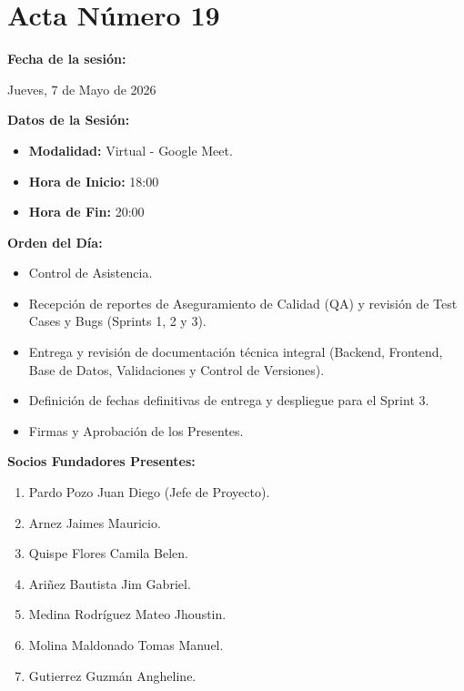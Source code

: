 \newpage
\section{Acta Número 19}
\label{sec:acta19}

\noindent \textbf{Fecha de la sesión:}\par
Jueves, 7 de Mayo de 2026

\vspace*{0.5cm}
\noindent \textbf{Datos de la Sesión:}
\vspace{-0.2cm}
\begin{itemize}[noitemsep]
    \item \textbf{Modalidad:} Virtual - Google Meet.
    \item \textbf{Hora de Inicio:} 18:00
    \item \textbf{Hora de Fin:} 20:00
\end{itemize}

\vspace*{0.5cm}
\noindent \textbf{Orden del Día:}
\vspace{-0.2cm}
\begin{itemize}[noitemsep]
    \item Control de Asistencia.
    \item Recepción de reportes de Aseguramiento de Calidad (QA) y revisión de Test Cases y Bugs (Sprints 1, 2 y 3).
    \item Entrega y revisión de documentación técnica integral (Backend, Frontend, Base de Datos, Validaciones y Control de Versiones).
    \item Definición de fechas definitivas de entrega y despliegue para el Sprint 3.
    \item Firmas y Aprobación de los Presentes.
\end{itemize}

\vspace*{0.5cm}
\noindent \textbf{Socios Fundadores Presentes:}
\vspace{-0.2cm}
\begin{enumerate}[noitemsep]
    \item Pardo Pozo Juan Diego (Jefe de Proyecto).
    \item Arnez Jaimes Mauricio.
    \item Quispe Flores Camila Belen.
    \item Ariñez Bautista Jim Gabriel.
    \item Medina Rodríguez Mateo Jhoustin.
    \item Molina Maldonado Tomas Manuel.
    \item Gutierrez Guzmán Angheline.
\end{enumerate}

